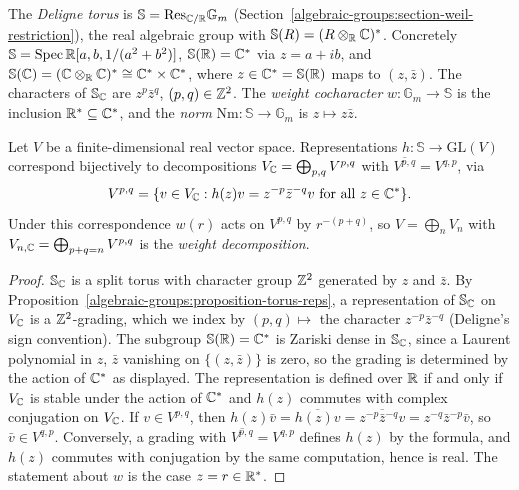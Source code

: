 \begin{definition}\label{algebraic-groups:definition-deligne-torus}
The \emph{Deligne torus} is $\mathbb{S} = \mathrm{Res}_{\mathbb{C}/\mathbb{R}}\mathbb{G}_m$ (Section~\ref{algebraic-groups:section-weil-restriction}), the real algebraic group with
$\mathbb{S}(R) = (R \otimes_{\mathbb{R}}\mathbb{C})^*$. Concretely $\mathbb{S} = \operatorname{Spec}\mathbb{R}[a, b, 1/(a^2 + b^2)]$, $\mathbb{S}(\mathbb{R}) = \mathbb{C}^*$ via $z = a + ib$, and
$\mathbb{S}(\mathbb{C}) = (\mathbb{C} \otimes_{\mathbb{R}}\mathbb{C})^* \cong \mathbb{C}^* \times \mathbb{C}^*$, where $z \in \mathbb{C}^* = \mathbb{S}(\mathbb{R})$ maps to $(z, \bar z)$. The characters of $\mathbb{S}_{\mathbb{C}}$ are
$z^p\bar z^q$, $(p, q) \in \mathbb{Z}^2$. The \emph{weight cocharacter} $w \colon \mathbb{G}_m \to \mathbb{S}$ is the inclusion $\mathbb{R}^* \subseteq \mathbb{C}^*$, and the \emph{norm}
$\mathrm{Nm} \colon \mathbb{S} \to \mathbb{G}_m$ is $z \mapsto z\bar z$.
\end{definition}

\begin{proposition}\label{algebraic-groups:proposition-deligne-torus}
Let $V$ be a finite-dimensional real vector space. Representations $h \colon \mathbb{S} \to \mathrm{GL}(V)$ correspond bijectively to decompositions
$V_{\mathbb{C}} = \bigoplus_{p,q}V^{p,q}$ with $\overline{V^{p,q}} = V^{q,p}$, via
\[
V^{p,q} = \{v \in V_{\mathbb{C}} : h(z)v = z^{-p}\bar z^{-q}v \text{ for all } z \in \mathbb{C}^*\}.
\]
Under this correspondence $w(r)$ acts on $V^{p,q}$ by $r^{-(p+q)}$, so $V = \bigoplus_nV_n$ with $V_{n,\mathbb{C}} = \bigoplus_{p+q=n}V^{p,q}$ is the \emph{weight decomposition}.
\end{proposition}

\begin{proof}
$\mathbb{S}_{\mathbb{C}}$ is a split torus with character group $\mathbb{Z}^2$ generated by $z$ and $\bar z$. By Proposition~\ref{algebraic-groups:proposition-torus-reps}, a representation of $\mathbb{S}_{\mathbb{C}}$ on
$V_{\mathbb{C}}$ is a $\mathbb{Z}^2$-grading, which we index by $(p, q) \mapsto$ the character $z^{-p}\bar z^{-q}$ (Deligne's sign convention). The subgroup $\mathbb{S}(\mathbb{R}) = \mathbb{C}^*$ is Zariski dense in
$\mathbb{S}_{\mathbb{C}}$, since a Laurent polynomial in $z$, $\bar z$ vanishing on $\{(z, \bar z)\}$ is zero, so the grading is determined by the action of $\mathbb{C}^*$ as displayed. The
representation is defined over $\mathbb{R}$ if and only if $V_{\mathbb{C}}$ is stable under the action of $\mathbb{C}^*$ and $h(z)$ commutes with complex conjugation on $V_{\mathbb{C}}$. If $v \in V^{p,q}$, then
$h(z)\bar v = \overline{h(z)v} = \overline{z^{-p}\bar z^{-q}v} = z^{-q}\bar z^{-p}\bar v$, so $\bar v \in V^{q,p}$. Conversely, a grading with $\overline{V^{p,q}} = V^{q,p}$ defines $h(z)$
by the formula, and $h(z)$ commutes with conjugation by the same computation, hence is real. The statement about $w$ is the case $z = r \in \mathbb{R}^*$.
\end{proof}

